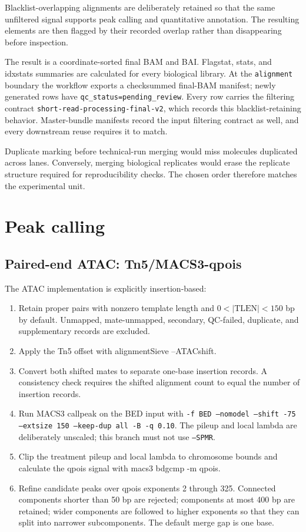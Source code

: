 \documentclass[11pt]{article}
\newcommand{\stage}[1]{\texttt{#1}}
\newcommand{\software}[1]{\textsf{#1}}
\begin{document}
Blacklist-overlapping alignments are deliberately retained so that the same
unfiltered signal supports peak calling and quantitative annotation.  The
resulting elements are then flagged by their recorded overlap rather than
disappearing before inspection.

The result is a coordinate-sorted final BAM and BAI.  Flagstat, stats, and
idxstats summaries are calculated for every biological library.  At the
\stage{alignment} boundary the workflow exports a checksummed final-BAM
manifest; newly generated rows have \texttt{qc\_status=pending\_review}.
Every row carries the filtering contract
\texttt{short-read-processing-final-v2}, which records this
blacklist-retaining behavior.  Master-bundle manifests record the input
filtering contract as well, and every downstream reuse requires it to match.

Duplicate marking before technical-run merging would miss molecules duplicated
across lanes.  Conversely, merging biological replicates would erase the
replicate structure required for reproducibility checks.  The chosen order
therefore matches the experimental unit.

\section{Peak calling}

\subsection{Paired-end ATAC: Tn5/MACS3-qpois}

The ATAC implementation is explicitly insertion-based:

\begin{enumerate}
  \item Retain proper pairs with nonzero template length and
  \(0 < |\mathrm{TLEN}| < 150\) bp by default.  Unmapped, mate-unmapped,
  secondary, QC-failed, duplicate, and supplementary records are excluded.
  \item Apply the Tn5 offset with \software{alignmentSieve --ATACshift}.
  \item Convert both shifted mates to separate one-base insertion records.  A
  consistency check requires the shifted alignment count to equal the number
  of insertion records.
  \item Run \software{MACS3 callpeak} on the BED input with
  \texttt{-f BED --nomodel --shift -75 --extsize 150 --keep-dup all -B
  -q 0.10}.  The pileup and local lambda are deliberately unscaled; this
  branch must not use \texttt{--SPMR}.
  \item Clip the treatment pileup and local lambda to chromosome bounds and
  calculate the qpois signal with \software{macs3 bdgcmp -m qpois}.
  \item Refine candidate peaks over qpois exponents 2 through 325.  Connected
  components shorter than 50 bp are rejected; components at most 400 bp are
  retained; wider components are followed to higher exponents so that they can
  split into narrower subcomponents.  The default merge gap is one base.
\end{enumerate}
\end{document}

